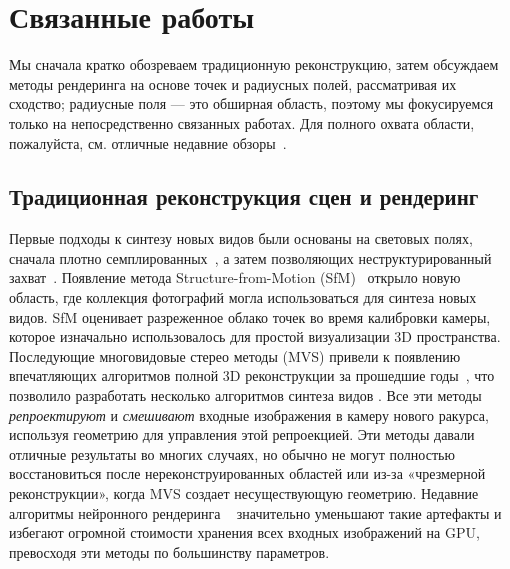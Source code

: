 \section{Связанные работы}
Мы сначала кратко обозреваем традиционную реконструкцию, затем обсуждаем методы рендеринга на основе точек и радиусных полей, рассматривая их сходство; радиусные поля — это обширная область, поэтому мы фокусируемся только на непосредственно связанных работах. 
Для полного охвата области, пожалуйста, см. отличные недавние обзоры~\cite{tewari2022advances,xie2022neural}.
\subsection{Традиционная реконструкция сцен и рендеринг}
Первые подходы к синтезу новых видов были основаны на световых полях, сначала плотно семплированных~\cite{gortler1996lumigraph,levoy1996light}, а затем позволяющих неструктурированный захват~\cite{buehler2001unstructured}. Появление метода Structure-from-Motion (SfM)~\cite{snavely2006photo} открыло новую область, где коллекция фотографий могла использоваться для синтеза новых видов. SfM оценивает разреженное облако точек во время калибровки камеры, которое изначально использовалось для простой визуализации 3D пространства. Последующие многовидовые стерео методы (MVS) привели к появлению впечатляющих алгоритмов полной 3D реконструкции за прошедшие годы~\cite{goesele2007multi}, что позволило разработать несколько алгоритмов синтеза видов \cite{eisemann2008floating, chaurasia2013depth, hedman2018deep,kopanas21}.
Все эти методы \emph{репроектируют} и \emph{смешивают} входные изображения в камеру нового ракурса, используя геометрию для управления этой репроекцией. Эти методы давали отличные результаты во многих случаях, но обычно не могут полностью восстановиться после нереконструированных областей или из-за «чрезмерной реконструкции», когда MVS создает несуществующую геометрию.
Недавние алгоритмы нейронного рендеринга ~\cite{tewari2022advances} значительно уменьшают такие артефакты и избегают огромной стоимости хранения всех входных изображений на GPU, превосходя эти методы по большинству параметров.
